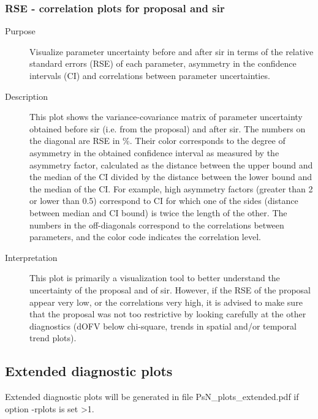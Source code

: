 \subsubsection{RSE - correlation plots for proposal and sir}
\begin{description}
\item[Purpose] Visualize parameter uncertainty before and after sir in terms of the relative standard errors (RSE) of each parameter, asymmetry in the confidence intervals (CI) and correlations between parameter uncertainties.
\item[Description] This plot shows the variance-covariance matrix of parameter uncertainty obtained before sir (i.e. from the proposal) and after sir. The numbers on the diagonal are RSE in \%. Their color corresponds to the degree of asymmetry in the obtained confidence interval as measured by the asymmetry factor, calculated as the distance between the upper bound and the  median of the CI divided by the distance between the lower bound and the median of the CI. For example, high asymmetry factors (greater than 2 or lower than 0.5) correspond to CI for which one of the sides (distance between median and CI bound) is twice the length of the other. The numbers in the off-diagonals correspond to the correlations between parameters, and the color code indicates the correlation level.
\item[Interpretation] This plot is primarily a visualization tool to better understand the uncertainty of the proposal and of sir. However, if the RSE of the proposal appear very low, or the correlations very high, it is advised to make sure that the proposal was not too restrictive by looking carefully at the other diagnostics (dOFV below chi-square, trends in spatial and/or temporal trend plots).
\end{description}


\subsection{Extended diagnostic plots}
Extended diagnostic plots will be generated in file PsN\_plots\_extended.pdf if option -rplots is set >1.

